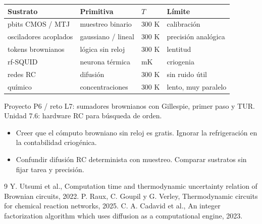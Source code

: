 \documentclass[11pt,a4paper]{article}
\begin{document}
\begin{center}\small\begin{tabular}{llll}\toprule
Sustrato & Primitiva & $T$ & Límite\\\midrule
pbits CMOS / MTJ & muestreo binario & 300 K & calibración\\
osciladores acoplados & gaussiano / lineal & 300 K & precisión analógica\\
tokens brownianos & lógica sin reloj & 300 K & lentitud\\
rf-SQUID & neurona térmica & mK & criogenia\\
redes RC & difusión & 300 K & sin ruido útil\\
químico & concentraciones & 300 K & lento, muy paralelo\\\bottomrule\end{tabular}\end{center}

\begin{aplicacion}
Proyecto P6 / reto L7: sumadores brownianos con Gillespie, primer paso y TUR. Unidad 7.6: hardware RC para búsqueda de orden.
\end{aplicacion}

\begin{error}
\begin{itemize}[nosep]
\item Creer que el cómputo browniano sin reloj es gratis. \quad Ignorar la refrigeración en la contabilidad criogénica.
\item Confundir difusión RC determinista con muestreo. \quad Comparar sustratos sin fijar tarea y precisión.
\end{itemize}
\end{error}

\begin{thebibliography}{9}\small
{} Y. Utsumi et al., Computation time and thermodynamic uncertainty relation of Brownian circuits, 2022.
 P. Raux, C. Goupil y G. Verley, Thermodynamic circuits for chemical reaction networks, 2025.
 C. A. Cadavid et al., An integer factorization algorithm which uses diffusion as a computational engine, 2023.
\end{thebibliography}
\end{document}
